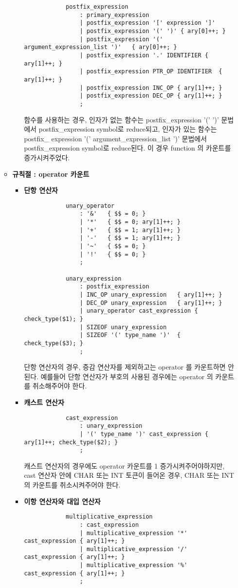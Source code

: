 \documentclass{article}
\begin{document}
\begin{itemize}
\begin{itemize}
\begin{itemize}
\begin{lstlisting}
			postfix_expression
				: primary_expression
				| postfix_expression '[' expression ']'
				| postfix_expression '(' ')' { ary[0]++; }
				| postfix_expression '(' argument_expression_list ')'	{ ary[0]++; }
				| postfix_expression '.' IDENTIFIER	{ ary[1]++; }
				| postfix_expression PTR_OP IDENTIFIER	{ ary[1]++; }
				| postfix_expression INC_OP	{ ary[1]++; }
				| postfix_expression DEC_OP	{ ary[1]++; }
				;
			\end{lstlisting}
			함수를 사용하는 경우, 인자가 없는 함수는 postfix\_expression '(' ')' 문법에서 postfix\_expression
			symbol로 reduce되고, 인자가 있는 함수는 postfix\_ expression '(' argument\_expression\_list ')'
			문법에서 postfix\_expression symbol로 reduce된다. 이 경우 function 의 카운트를 증가시켜주었다.
		\end{itemize}

		\item {\bf 규칙절 : operator 카운트}
		\begin{itemize}
			\item {\bf 단항 연산자}
			\begin{lstlisting}
			unary_operator
				: '&'	{ $$ = 0; }
				| '*'	{ $$ = 0; ary[1]++; }
				| '+'	{ $$ = 1; ary[1]++; }
				| '-'	{ $$ = 1; ary[1]++; }
				| '~'	{ $$ = 0; }
				| '!'	{ $$ = 0; }
				;

			unary_expression
				: postfix_expression
				| INC_OP unary_expression	{ ary[1]++; }
				| DEC_OP unary_expression	{ ary[1]++; }
				| unary_operator cast_expression { check_type($1); }
				| SIZEOF unary_expression
				| SIZEOF '(' type_name ')'	{ check_type($3); }
				;
			\end{lstlisting} 
			단항 연산자의 경우, 증감 연산자를 제외하고는 operator 를 카운트하면 안된다.
			예를들어 단항 연산자가 부호의 사용된 경우에는 operator 의 카운트를 취소해주어야 한다.

			\item {\bf 캐스트 연산자}
			\begin{lstlisting}
			cast_expression
				: unary_expression
				| '(' type_name ')' cast_expression	{ ary[1]++; check_type($2); }
				;
			\end{lstlisting}
			캐스트 연산자의 경우에도 operator 카운트를 1 증가시켜주어야하지만, cast 연산자 안에
			CHAR 또는 INT 토큰이 들어온 경우, CHAR 또는 INT 의 카운트를 취소시켜주어야 한다.
			
			\item {\bf 이항 연산자와 대입 연산자}
			\begin{lstlisting}
			multiplicative_expression
				: cast_expression
				| multiplicative_expression '*' cast_expression	{ ary[1]++; }
				| multiplicative_expression '/' cast_expression	{ ary[1]++; }
				| multiplicative_expression '%' cast_expression	{ ary[1]++; }
				;


\end{lstlisting}
\end{itemize}
\end{itemize}
\end{itemize}
\end{document}

